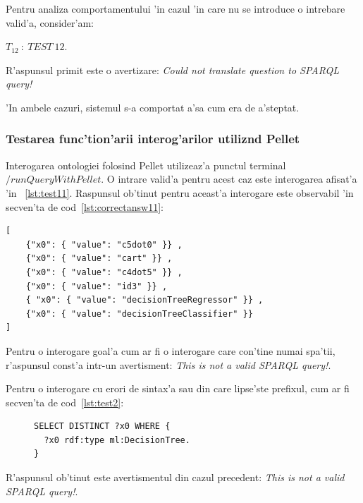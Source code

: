 \documentclass[12pt,a4paper,twoside]{report}
\begin{document}
Pentru analiza comportamentului 'in cazul 'in care nu se introduce o intrebare valid'a, consider'am:
\begin{center}
$T_{12}\ :\ TEST\ 12$.
\end{center}

R'aspunsul primit este o avertizare: {\it Could not translate question to SPARQL query!}

'In ambele cazuri, sistemul s-a comportat a'sa cum era de a'steptat.

\subsubsection{Testarea func'tion'arii interog'arilor utiliz\ia nd Pellet}

Interogarea ontologiei folosind Pellet utilizeaz'a punctul terminal $/runQueryWithPellet$.
O intrare valid'a pentru acest caz este interogarea afisat'a 'in ~\ref{lst:test11}. Raspunsul ob'tinut pentru aceast'a interogare este observabil 'in secven'ta de cod~\ref{lst:correctansw11}:
\begin{lstlisting}[basicstyle=\footnotesize, caption = R'aspuns la 'intrebarea $T_{11} prin Pellet$, label=lst:correctansw11]
[
    {"x0": { "value": "c5dot0" }} ,
    {"x0": { "value": "cart" }} ,
    {"x0": { "value": "c4dot5" }} ,
    {"x0": { "value": "id3" }} ,
    { "x0": { "value": "decisionTreeRegressor" }} ,
    {"x0": { "value": "decisionTreeClassifier" }}
]
\end{lstlisting}

Pentru o interogare goal'a cum ar fi o interogare care con'tine numai spa'tii, r'aspunsul const'a intr-un avertisment:  {\it This is not a valid SPARQL query!}.

Pentru o interogare cu erori de sintax'a sau din care lipse'ste prefixul, cum ar fi secven'ta de cod~\ref{lst:test2}:

\begin{figure}[h]
\begin{footnotesize}
\begin{lstlisting}[captionpos=b, caption=Interogare SPARQL defectuoas'a, label=lst:test2,  basicstyle=\ttfamily,frame=single]
SELECT DISTINCT ?x0 WHERE {
  ?x0 rdf:type ml:DecisionTree.
}
\end{lstlisting}
\end{footnotesize}
\end{figure}


R'aspunsul ob'tinut este avertismentul din cazul precedent:  {\it This is not a valid SPARQL query!}.
\end{document}
